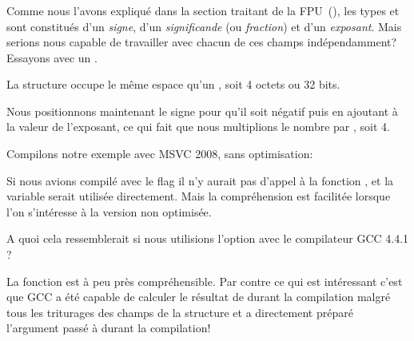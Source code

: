 ﻿\subsubsection{\WorkingWithFloatAsWithStructSubSubSectionName}
\label{sec:floatasstruct}

Comme nous l'avons expliqué dans la section traitant de la FPU~(), les types \Tfloat et 
\Tdouble sont constitués d'un \emph{signe}, d'un \emph{significande} (ou \emph{fraction}) et d'un \emph{exposant}.
Mais serions nous capable de travailler avec chacun de ces champs indépendamment? Essayons avec un \Tfloat.





La structure  occupe le même espace qu'un \Tfloat, soit 4 octets ou 32 bits.

Nous positionnons maintenant le signe pour qu'il soit négatif puis en ajoutant à la valeur de l'exposant, 
ce qui fait que nous multiplions le nombre par , soit 4.

Compilons notre exemple avec MSVC 2008, sans optimisation:



Si nous avions compilé avec le flag \Ox il n'y aurait pas d'appel à la fonction , et la variable 
 serait utilisée directement. Mais la compréhension est facilitée lorsque l'on s'intéresse à la version 
non optimisée.

A quoi cela ressemblerait si nous utilisions l'option \Othree avec le compilateur GCC 4.4.1 ?



La fonction \ttf est à peu près compréhensible. Par contre ce qui est intéressant c'est que GCC a été 
capable de calculer le résultat de  durant la compilation malgré tous les triturages des champs 
de la structure et a directement préparé l'argument passé à \printf{} durant la compilation!
